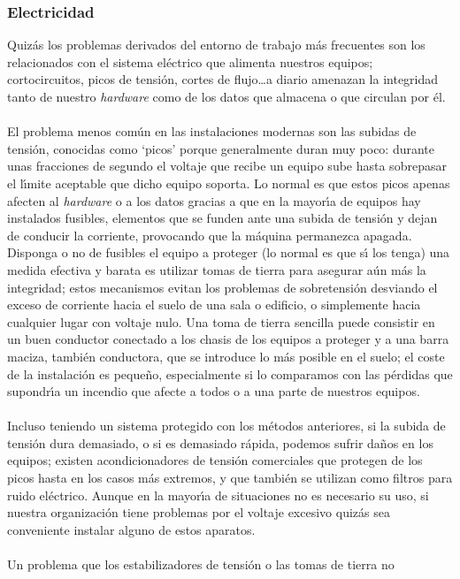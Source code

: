 \subsubsection{Electricidad}
Quiz\'as los problemas derivados del entorno de trabajo m\'as frecuentes son
los relacionados con el sistema el\'ectrico que alimenta nuestros equipos; 
cortocircuitos, picos de tensi\'on, cortes de flujo\ldots a diario amenazan
la integridad tanto de nuestro {\it hardware} como de los datos que almacena
o que circulan por \'el.\\
\\El problema menos com\'un en las instalaciones modernas son las subidas 
de tensi\'on, conocidas como `picos' porque generalmente duran muy poco: durante
unas fracciones de segundo el voltaje que recibe un equipo sube hasta sobrepasar
el l\'{\i}mite aceptable que dicho equipo soporta. Lo normal es 
que estos picos apenas afecten al {\it hardware} o a los datos gracias a que en
la mayor\'{\i}a de equipos hay instalados fusibles, elementos que se funden ante
una subida de tensi\'on y dejan de conducir la corriente, provocando que la 
m\'aquina permanezca apagada. Disponga o no de fusibles el equipo a proteger
(lo normal es que s\'{\i} los tenga) una medida efectiva y barata es utilizar
tomas de tierra para asegurar a\'un m\'as la integridad; estos mecanismos 
evitan los problemas de sobretensi\'on desviando el exceso de corriente hacia
el suelo de una sala o edificio, o simplemente hacia cualquier lugar con voltaje
nulo. Una toma de tierra sencilla puede consistir en un buen conductor conectado
a los chasis de los equipos a proteger y a una barra maciza, tambi\'en 
conductora, que se introduce lo m\'as posible en el suelo; el coste de la 
instalaci\'on es peque\~no, especialmente si lo comparamos con las p\'erdidas
que supondr\'{\i}a un incendio que afecte a todos o a una parte de nuestros
equipos.\\
\\Incluso teniendo un sistema protegido con los m\'etodos anteriores, si la
subida de tensi\'on dura demasiado, o si es demasiado r\'apida, podemos sufrir
da\~nos en los equipos; existen acondicionadores de tensi\'on comerciales que
protegen de los picos hasta en los casos m\'as extremos, y que tambi\'en se
utilizan como filtros para ruido el\'ectrico. Aunque en la mayor\'{\i}a de
situaciones no es necesario su uso, si nuestra organizaci\'on tiene problemas
por el voltaje excesivo quiz\'as sea conveniente instalar alguno de estos
aparatos.\\
\\Un problema que los estabilizadores de tensi\'on o las tomas de tierra no
